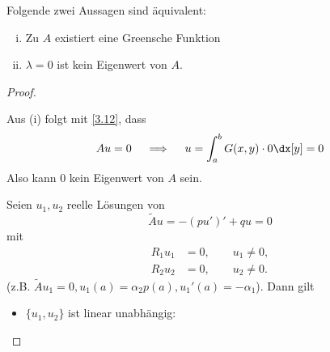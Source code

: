 \begin{st} \label{3.14}
	Folgende zwei Aussagen sind äquivalent:
	\begin{enumerate}[(i)]
		\item
			Zu $A$ existiert eine Greensche Funktion
		\item
			$\lambda = 0$ ist kein Eigenwert von $A$.
	\end{enumerate}
	\begin{proof}
		\begin{seg}[(i)$\implies$(ii)]
			Aus (i) folgt mit \ref{3.12}, dass
			\[
				Au = 0 \quad\implies\quad u = \int_a^b G(x,y) \cdot 0 \dx[y] = 0
			\]
			Also kann $0$ kein Eigenwert von $A$ sein.
		\end{seg}
		\begin{seg}[(ii)$\implies$(i)]
			Seien $u_1,u_2$ reelle Lösungen von 
			\[
				\tilde A u = -(pu')' + qu = 0
			\]
			mit
			\begin{align*}
				R_1u_1 &= 0, \qquad u_1 \neq 0, \\
				R_2u_2 &= 0, \qquad u_2 \neq 0.
			\end{align*}
			(z.B. $\tilde A u_1 = 0, u_1(a) = \alpha_2 p(a), u_1'(a) = - \alpha_1$).
			Dann gilt
			\begin{itemize}
				\item
					$\{u_1,u_2\}$ ist linear unabhängig:


\end{itemize}
\end{seg}
\end{proof}
\end{st}
